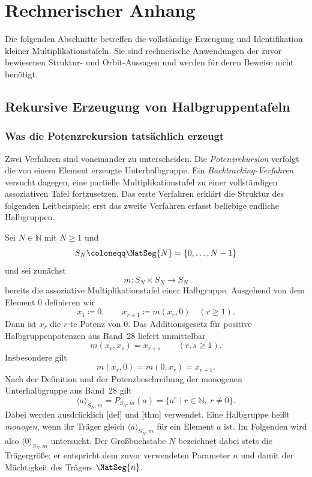 \documentclass[main.tex]{subfiles}
\begin{document}


\chapter{Rechnerischer Anhang}

Die folgenden Abschnitte betreffen die vollständige Erzeugung und
Identifikation kleiner Multiplikationstafeln.  Sie sind rechnerische
Anwendungen der zuvor bewiesenen Struktur- und Orbit-Aussagen und werden
für deren Beweise nicht benötigt.

\section{Rekursive Erzeugung von Halbgruppentafeln}

\subsection{Was die Potenzrekursion tatsächlich erzeugt}

Zwei Verfahren sind voneinander zu unterscheiden.  Die
\emph{Potenzrekursion} verfolgt die von einem Element erzeugte
Unterhalbgruppe.  Ein \emph{Backtracking-Verfahren} versucht dagegen, eine
partielle Multiplikationstafel zu einer vollständigen assoziativen Tafel
fortzusetzen.  Das erste Verfahren erklärt die Struktur des folgenden
Leitbeispiels; erst das zweite Verfahren erfasst beliebige endliche
Halbgruppen.

Sei \(N\in\mathbb N\) mit \(N\geq1\) und
\[
  S_N\coloneqq\NatSeg{N}=\{0,\ldots,N-1\}
\]
und sei zunächst
\[
  m\colon S_N\times S_N\to S_N
\]
bereits die assoziative Multiplikationstafel einer Halbgruppe.  Ausgehend von
dem Element \(0\) definieren wir
\[
  x_1\coloneqq0,
  \qquad
  x_{r+1}\coloneqq m(x_r,0)
  \quad(r\geq1).
\]
Dann ist \(x_r\) die \(r\)-te Potenz von \(0\).  Das Additionsgesetz für
positive Halbgruppenpotenzen aus Band~28 liefert unmittelbar
\[
  \boxed{m(x_r,x_s)=x_{r+s}}
  \qquad(r,s\geq1).
\]
Insbesondere gilt
\[
  m(x_r,0)=m(0,x_r)=x_{r+1}.
\]
Nach der Definition und der Potenzbeschreibung der monogenen
Unterhalbgruppe aus Band~28 gilt
\[
  \langle a\rangle_{S_N,m}
  =P_{S_N,m}(a)
  =\{a^r\mid r\in\mathbb N,\ r\neq0\}.
\]
Dabei werden ausdrücklich
[def] und
[thm] verwendet.  Eine
Halbgruppe heißt \emph{monogen}, wenn ihr Träger gleich
\(\langle a\rangle_{S_N,m}\) für ein Element \(a\) ist.  Im Folgenden wird
also \(\langle0\rangle_{S_N,m}\) untersucht.  Der Großbuchstabe \(N\) bezeichnet dabei
stets die Trägergröße; er entspricht dem zuvor verwendeten Parameter \(n\)
und damit der Mächtigkeit des Trägers \(\NatSeg{n}\).
\end{document}

